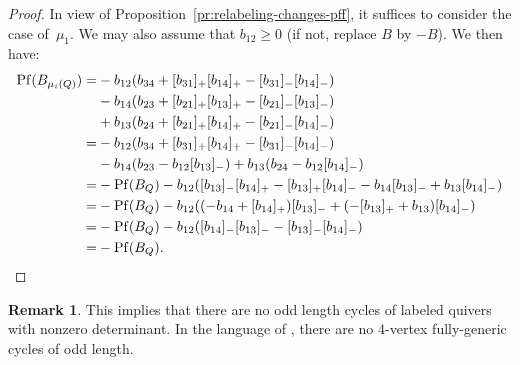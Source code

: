 \documentclass[11pt, letterpaper]{amsart}
\theoremstyle{definition}
\newtheorem{remark}[theorem]{Remark}
\numberwithin{equation}{section}
\newcommand\Pf{\operatorname{Pf}}
\begin{document}
\begin{proof}
In view of Proposition~\ref{pr:relabeling-changes-pff}, it suffices to consider the case of~$\mu_1$. 
We may also assume that $b_{12}\geq 0$ (if not, replace $B$ by $-B$).
We then have:
\begin{align*}
\Pf(B_{\mu_i(Q)}) = &- b_{12} (b_{34} + [b_{31}]_+ [b_{14}]_+ - [b_{31}]_- [b_{14}]_-) \\
 &- b_{14} (b_{23} + [b_{21}]_+ [b_{13}]_+ - [b_{21}]_- [b_{13}]_-) \\
& + b_{13} (b_{24} + [b_{21}]_+ [b_{14}]_+ - [b_{21}]_- [b_{14}]_-) \\
= &- b_{12} (b_{34} + [b_{31}]_+ [b_{14}]_+ - [b_{31}]_- [b_{14}]_-) \\
 &- b_{14} (b_{23} - b_{12} [b_{13}]_-) + b_{13} (b_{24} -  b_{12} [b_{14}]_-) \\
= &- \Pf(B_Q) - b_{12} ( [b_{13}]_- [b_{14}]_+   -   [b_{13}]_+ [b_{14}]_-    - b_{14}  [b_{13}]_- + b_{13} [b_{14}]_-)\\
= &- \Pf(B_Q) - b_{12} (   (-b_{14} + [b_{14}]_+) [b_{13}]_- + (-[b_{13}]_+  + b_{13}) [b_{14}]_-) \\
= &-\Pf(B_Q) - b_{12} (  [b_{14}]_- [b_{13}]_- - [b_{13}]_- [b_{14}]_-) \\
= &- \Pf(B_Q). \qedhere
\end{align*}
\end{proof}

\begin{remark}
This implies that there are no odd length cycles of labeled quivers with nonzero determinant. In the language of \cite{LMC}, there are no $4$-vertex fully-generic cycles of odd length.
\end{remark}
\fi



\end{document}
